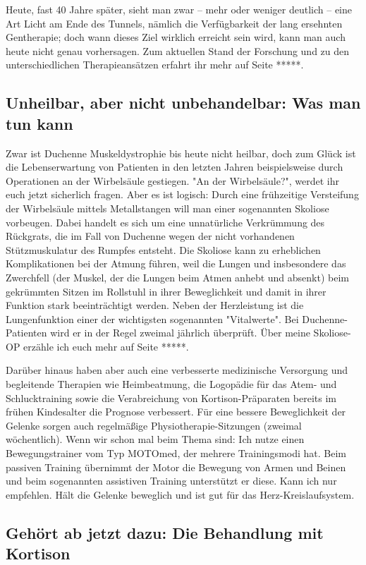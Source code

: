 \documentclass[fontsize=14pt,a4paper,headinclude,DIV=calc,automark]{scrbook}
\begin{document}
Heute, fast 40 Jahre später, sieht man zwar – mehr oder weniger deutlich – eine Art Licht am Ende des Tunnels, nämlich die Verfügbarkeit der lang ersehnten Gentherapie; doch wann dieses Ziel wirklich erreicht sein wird, kann man auch heute nicht genau vorhersagen. Zum aktuellen Stand der Forschung und zu den unterschiedlichen Therapieansätzen erfahrt ihr mehr auf Seite *****.

\subsection{Unheilbar, aber nicht unbehandelbar: Was man tun kann}

Zwar ist Duchenne Muskeldystrophie bis heute nicht heilbar, doch zum Glück ist die Lebenserwartung von Patienten in den letzten Jahren beispielsweise durch Operationen an der Wirbelsäule gestiegen. "An der Wirbelsäule?", werdet ihr euch jetzt sicherlich fragen. Aber es ist logisch: Durch eine frühzeitige Versteifung der Wirbelsäule mittels Metallstangen will man einer sogenannten Skoliose vorbeugen. Dabei handelt es sich um eine unnatürliche Verkrümmung des Rückgrats, die im Fall von Duchenne wegen der nicht vorhandenen Stützmuskulatur des Rumpfes entsteht. Die Skoliose kann zu erheblichen Komplikationen bei der Atmung führen, weil die Lungen und insbesondere das Zwerchfell (der Muskel, der die Lungen beim Atmen anhebt und absenkt) beim gekrümmten Sitzen im Rollstuhl in ihrer Beweglichkeit und damit in ihrer Funktion stark beeinträchtigt werden. Neben der Herzleistung ist die Lungenfunktion einer der wichtigsten sogenannten "Vitalwerte". Bei Duchenne-Patienten wird er in der Regel zweimal jährlich überprüft. Über meine Skoliose-OP erzähle ich euch mehr auf Seite *****.

Darüber hinaus haben aber auch eine verbesserte medizinische Versorgung und begleitende Therapien wie Heimbeatmung, die Logopädie für das Atem- und Schlucktraining sowie die Verabreichung von Kortison-Präparaten bereits im frühen Kindesalter die Prognose verbessert. Für eine bessere Beweglichkeit der Gelenke sorgen auch regelmäßige Physiotherapie-Sitzungen (zweimal wöchentlich). Wenn wir schon mal beim Thema sind: Ich nutze einen Bewegungstrainer vom Typ MOTOmed, der mehrere Trainingsmodi hat. Beim passiven Training übernimmt der Motor die Bewegung von Armen und Beinen und beim sogenannten assistiven Training unterstützt er diese. Kann ich nur empfehlen. Hält die Gelenke beweglich und ist gut für das Herz-Kreislaufsystem.

\subsection{Gehört ab jetzt dazu: Die Behandlung mit Kortison}
\end{document}
